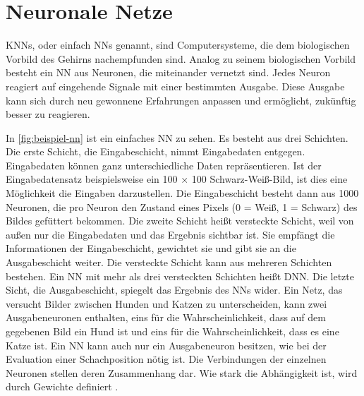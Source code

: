 \section{Neuronale Netze}

\Acp{KNN}, oder einfach \acp{NN} genannt, sind Computersysteme, die dem biologischen Vorbild des Gehirns nachempfunden sind. Analog zu seinem biologischen Vorbild besteht ein \ac{NN} aus Neuronen, die miteinander vernetzt sind. Jedes Neuron reagiert auf eingehende Signale mit einer bestimmten Ausgabe. Diese Ausgabe kann sich durch neu gewonnene Erfahrungen anpassen und ermöglicht, zukünftig besser zu reagieren.

In \autoref{fig:beispiel-nn} ist ein einfaches \Acl{NN} zu sehen. Es besteht aus drei Schichten. Die erste Schicht, die Eingabeschicht, nimmt Eingabedaten entgegen. Eingabedaten können ganz unterschiedliche Daten repräsentieren. Ist der Eingabedatensatz beispielsweise ein 100 × 100 Schwarz-Weiß-Bild, ist dies eine Möglichkeit die Eingaben darzustellen. Die Eingabeschicht besteht dann aus 1000 Neuronen, die pro Neuron den Zustand eines Pixels (0 = Weiß, 1 = Schwarz) des Bildes gefüttert bekommen. Die zweite Schicht heißt versteckte Schicht, weil von außen nur die Eingabedaten und das Ergebnis sichtbar ist. Sie empfängt die Informationen der Eingabeschicht, gewichtet sie und gibt sie an die Ausgabeschicht weiter. Die versteckte Schicht kann aus mehreren Schichten bestehen. Ein \ac{NN} mit mehr als drei versteckten Schichten heißt \ac{DNN}. Die letzte Sicht, die Ausgabeschicht, spiegelt das Ergebnis des \acp{NN} wider. Ein Netz, das versucht Bilder zwischen Hunden und Katzen zu unterscheiden, kann zwei Ausgabeneuronen enthalten, eins für die Wahrscheinlichkeit, dass auf dem gegebenen Bild ein Hund ist und eins für die Wahrscheinlichkeit, dass es eine Katze ist. Ein \ac{NN} kann auch nur ein Ausgabeneuron besitzen, wie \zb{} bei der Evaluation einer Schachposition nötig ist. Die Verbindungen der einzelnen Neuronen stellen deren Zusammenhang dar. Wie stark die Abhängigkeit ist, wird durch Gewichte definiert \cite[S. 2--7]{krawczak2013multilayer}.

